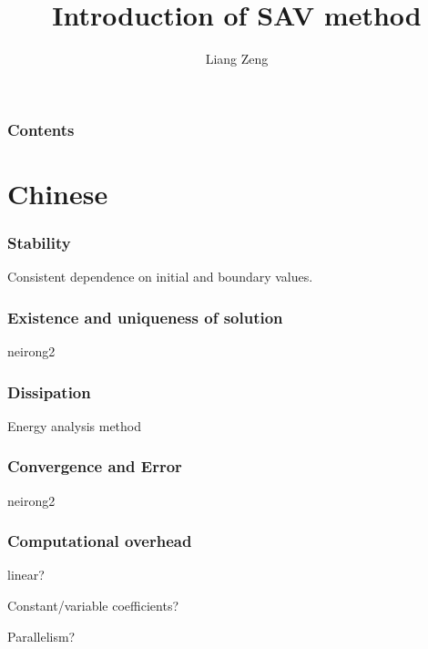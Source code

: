 \documentclass{beamer}
\title{Introduction of SAV method}
\author{Liang Zeng}
\begin{document}
\frame{\titlepage}
\begin{frame}
\frametitle{Contents}
  \tableofcontents
\end{frame}
\section{Chinese}
    \begin{frame}
    \frametitle{Stability}

Consistent dependence on initial and boundary values.


    \end{frame}
    \begin{frame}
    \frametitle{Existence and uniqueness of solution}

        neirong2

    \end{frame}
    \begin{frame}
    \frametitle{Dissipation}

        Energy analysis method

    \end{frame}
    \begin{frame}
    \frametitle{Convergence and Error}

        neirong2

    \end{frame}
    \begin{frame}
    \frametitle{Computational overhead}

        linear?

    Constant/variable coefficients?

    Parallelism?

    \end{frame}
\end{document}
